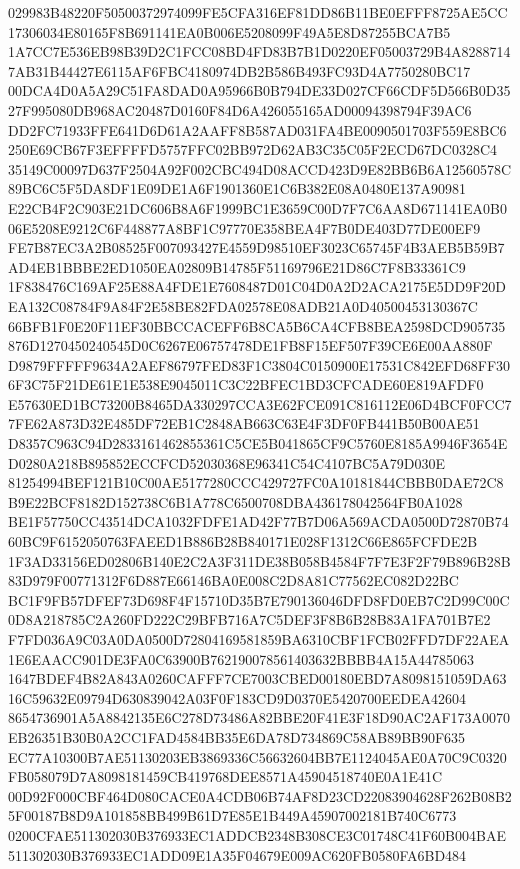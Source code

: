 \documentclass[UTF8,fontset=fandol,zihao=-4,a4paper]{ctexart}
\begin{document}
{{029983B48220F50500372974099FE5CFA316EF81DD86B11BE0EFFF8725AE5CC17306034E80165F8B691141EA0B006E5208099F49A5E8D87255BCA7B5
1A7CC7E536EB98B39D2C1FCC08BD4FD83B7B1D0220EF05003729B4A82887147AB31B44427E6115AF6FBC4180974DB2B586B493FC93D4A7750280BC17
00DCA4D0A5A29C51FA8DAD0A95966B0B794DE33D027CF66CDF5D566B0D3527F995080DB968AC20487D0160F84D6A426055165AD00094398794F39AC6
DD2FC71933FFE641D6D61A2AAFF8B587AD031FA4BE0090501703F559E8BC6250E69CB67F3EFFFFD5757FFC02BB972D62AB3C35C05F2ECD67DC0328C4
35149C00097D637F2504A92F002CBC494D08ACCD423D9E82BB6B6A12560578C89BC6C5F5DA8DF1E09DE1A6F1901360E1C6B382E08A0480E137A90981
E22CB4F2C903E21DC606B8A6F1999BC1E3659C00D7F7C6AA8D671141EA0B006E5208E9212C6F448877A8BF1C97770E358BEA4F7B0DE403D77DE00EF9
FE7B87EC3A2B08525F007093427E4559D98510EF3023C65745F4B3AEB5B59B7AD4EB1BBBE2ED1050EA02809B14785F51169796E21D86C7F8B33361C9
1F838476C169AF25E88A4FDE1E7608487D01C04D0A2D2ACA2175E5DD9F20DEA132C08784F9A84F2E58BE82FDA02578E08ADB21A0D40500453130367C
66BFB1F0E20F11EF30BBCCACEFF6B8CA5B6CA4CFB8BEA2598DCD905735876D1270450240545D0C6267E06757478DE1FB8F15EF507F39CE6E00AA880F
D9879FFFFF9634A2AEF86797FED83F1C3804C0150900E17531C842EFD68FF306F3C75F21DE61E1E538E9045011C3C22BFEC1BD3CFCADE60E819AFDF0
E57630ED1BC73200B8465DA330297CCA3E62FCE091C816112E06D4BCF0FCC77FE62A873D32E485DF72EB1C2848AB663C63E4F3DF0FB441B50B00AE51
D8357C963C94D2833161462855361C5CE5B041865CF9C5760E8185A9946F3654ED0280A218B895852ECCFCD52030368E96341C54C4107BC5A79D030E
81254994BEF121B10C00AE5177280CCC429727FC0A10181844CBBB0DAE72C8B9E22BCF8182D152738C6B1A778C6500708DBA436178042564FB0A1028
BE1F57750CC43514DCA1032FDFE1AD42F77B7D06A569ACDA0500D72870B7460BC9F6152050763FAEED1B886B28B840171E028F1312C66E865FCFDE2B
1F3AD33156ED02806B140E2C2A3F311DE38B058B4584F7F7E3F2F79B896B28B83D979F00771312F6D887E66146BA0E008C2D8A81C77562EC082D22BC
BC1F9FB57DFEF73D698F4F15710D35B7E790136046DFD8FD0EB7C2D99C00C0D8A218785C2A260FD222C29BFB716A7C5DEF3F8B6B28B83A1FA701B7E2
F7FD036A9C03A0DA0500D72804169581859BA6310CBF1FCB02FFD7DF22AEA1E6EAACC901DE3FA0C63900B762190078561403632BBBB4A15A44785063
1647BDEF4B82A843A0260CAFFF7CE7003CBED00180EBD7A8098151059DA6316C59632E09794D630839042A03F0F183CD9D0370E5420700EEDEA42604
8654736901A5A8842135E6C278D73486A82BBE20F41E3F18D90AC2AF173A0070EB26351B30B0A2CC1FAD4584BB35E6DA78D734869C58AB89BB90F635
EC77A10300B7AE51130203EB3869336C56632604BB7E1124045AE0A70C9C0320FB058079D7A8098181459CB419768DEE8571A45904518740E0A1E41C
00D92F000CBF464D080CACE0A4CDB06B74AF8D23CD22083904628F262B08B25F00187B8D9A101858BB499B61D7E85E1B449A45907002181B740C6773
0200CFAE511302030B376933EC1ADDCB2348B308CE3C01748C41F60B004BAE511302030B376933EC1ADD09E1A35F04679E009AC620FB0580FA6BD484
}}
\end{document}
